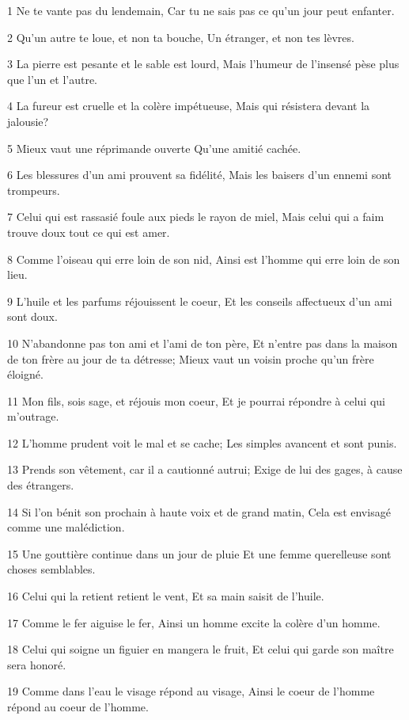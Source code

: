 \par 1 Ne te vante pas du lendemain, Car tu ne sais pas ce qu'un jour peut enfanter.
\par 2 Qu'un autre te loue, et non ta bouche, Un étranger, et non tes lèvres.
\par 3 La pierre est pesante et le sable est lourd, Mais l'humeur de l'insensé pèse plus que l'un et l'autre.
\par 4 La fureur est cruelle et la colère impétueuse, Mais qui résistera devant la jalousie?
\par 5 Mieux vaut une réprimande ouverte Qu'une amitié cachée.
\par 6 Les blessures d'un ami prouvent sa fidélité, Mais les baisers d'un ennemi sont trompeurs.
\par 7 Celui qui est rassasié foule aux pieds le rayon de miel, Mais celui qui a faim trouve doux tout ce qui est amer.
\par 8 Comme l'oiseau qui erre loin de son nid, Ainsi est l'homme qui erre loin de son lieu.
\par 9 L'huile et les parfums réjouissent le coeur, Et les conseils affectueux d'un ami sont doux.
\par 10 N'abandonne pas ton ami et l'ami de ton père, Et n'entre pas dans la maison de ton frère au jour de ta détresse; Mieux vaut un voisin proche qu'un frère éloigné.
\par 11 Mon fils, sois sage, et réjouis mon coeur, Et je pourrai répondre à celui qui m'outrage.
\par 12 L'homme prudent voit le mal et se cache; Les simples avancent et sont punis.
\par 13 Prends son vêtement, car il a cautionné autrui; Exige de lui des gages, à cause des étrangers.
\par 14 Si l'on bénit son prochain à haute voix et de grand matin, Cela est envisagé comme une malédiction.
\par 15 Une gouttière continue dans un jour de pluie Et une femme querelleuse sont choses semblables.
\par 16 Celui qui la retient retient le vent, Et sa main saisit de l'huile.
\par 17 Comme le fer aiguise le fer, Ainsi un homme excite la colère d'un homme.
\par 18 Celui qui soigne un figuier en mangera le fruit, Et celui qui garde son maître sera honoré.
\par 19 Comme dans l'eau le visage répond au visage, Ainsi le coeur de l'homme répond au coeur de l'homme.

